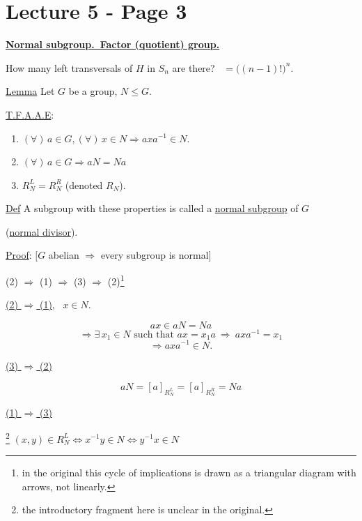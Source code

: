 \section*{Lecture 5 - Page 3}

\noindent\underline{\textbf{Normal subgroup.\ Factor (quotient) group.}}

\bigskip
\noindent How many left transversals of $H$ in $S_n$ are there? \ $=\big((n-1)!\big)^n$.

\bigskip
\noindent\underline{Lemma} Let $G$ be a group, $N\leq G$.

\noindent\underline{T.F.A.A.E}:

\begin{enumerate}
\item[(1)] $(\forall)\, a\in G, (\forall)\, x\in N \Rightarrow axa^{-1}\in N$.
\item[(2)] $(\forall)\, a\in G \Rightarrow aN=Na$
\item[(3)] $R_N^L = R_N^R$ (denoted $R_N$).
\end{enumerate}

\noindent\underline{Def} A subgroup with these properties is called a \underline{normal subgroup} of $G$

\noindent (\underline{normal divisor}).

\bigskip
\noindent\underline{Proof}: $\big[G$ abelian $\Rightarrow$ every subgroup is normal$\big]$

\bigskip
\begin{center}
(2) $\Rightarrow$ (1) $\Rightarrow$ (3) $\Rightarrow$ (2)\footnote{in the original this cycle of implications is drawn as a triangular diagram with arrows, not linearly.}
\end{center}

\bigskip
\noindent\underline{(2) $\Rightarrow$ (1)}, \ $x\in N$.

\[
ax\in aN=Na
\]
\[
\Rightarrow \exists\, x_1\in N \text{ such that } ax=x_1a \ \Rightarrow \ axa^{-1}=x_1
\]
\[
\Rightarrow axa^{-1}\in N.
\]

\bigskip
\noindent\underline{(3) $\Rightarrow$ (2)}

\[
aN = [a]_{R_N^L} = [a]_{R_N^R} = Na
\]

\bigskip
\noindent\underline{(1) $\Rightarrow$ (3)}

\noindent\footnote{the introductory fragment here is unclear in the original.} $(x,y)\in R_N^L \Leftrightarrow x^{-1}y\in N \Leftrightarrow y^{-1}x\in N$

